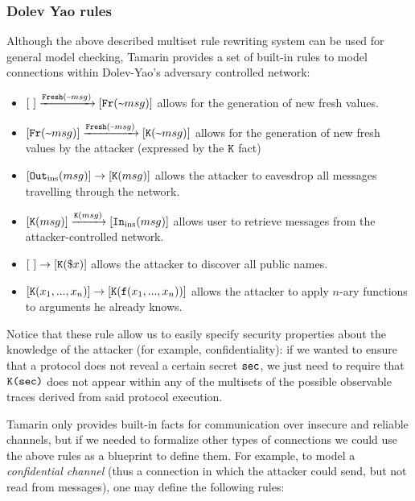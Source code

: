 \documentclass{article}
\newcommand{\mono}[1]{\textrm{\tt #1}}
\begin{document}
\subsubsection{Dolev Yao rules}\label{sec:DolevYaoRules}
Although the above described multiset rule rewriting system can be used for general model checking, Tamarin provides a set of built-in rules to model connections within Dolev-Yao's adversary controlled network:

\begin{itemize}
    \item $[ \ ] \xrightarrow{\mono{Fresh}(\textrm{\textasciitilde} msg)} [ \mono{Fr}(\textrm{\textasciitilde} msg) ]$ allows for the generation of new fresh values.
    \item $[ \mono{Fr}(\textrm{\textasciitilde} msg) ] \xrightarrow{\mono{Fresh}(\textrm{\textasciitilde} msg)} [ \mono{K}(\textrm{\textasciitilde} msg) ]$ allows for the generation of new fresh values by the attacker (expressed by the $\mono{K}$ fact)
    \item $[ \mono{Out}_{\textrm{ins}}(msg) ] \to [ \mono{K}(msg) ]$ allows the attacker to eavesdrop all messages travelling through the network. 
    \item $[ \mono{K}(msg) ] \xrightarrow{\mono{K}(msg)} [ \mono{In}_{\textrm{ins}}(msg) ]$ allows user to retrieve messages from the attacker-controlled network.
    \item $[ \ ] \to [ \mono{K}(\$x) ]$ allows the attacker to discover all public names.
    \item $[ \mono{K}(x_1,...,x_n) ] \to [ \mono{K}(\mono{f}(x_1,...,x_n)) ]$ allows the attacker to apply $n$-ary functions to arguments he already knows.
\end{itemize}

Notice that these rule allow us to easily specify security properties about the knowledge of the attacker (for example, confidentiality): if we wanted to ensure that a protocol does not reveal a certain secret $\mono{sec}$, we just need to require that $\mono{K(sec)}$ does not appear within any of the multisets of the possible observable traces derived from said protocol execution.

Tamarin only provides built-in facts for communication over insecure and reliable channels, but if we needed to formalize other types of connections we could use the above rules as a blueprint to define them. For example, to model a \textit{confidential channel} (thus a connection in which the attacker could send, but not read from messages), one may define the following rules:
\end{document}

